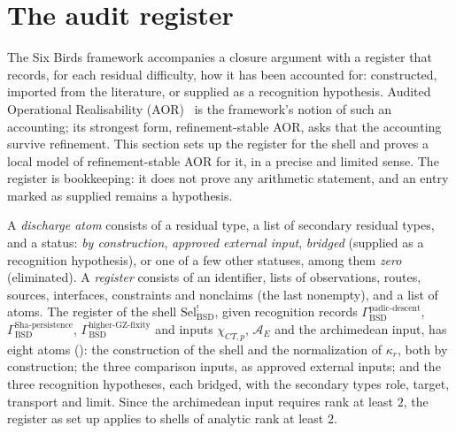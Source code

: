 \documentclass[11pt]{article}
\theoremstyle{definition}
\newcommand{\kapr}{\kappa_r}
\newcommand{\SelBSD}{\mathrm{Sel}^{!}_{\mathrm{BSD}}}   \newcommand{\rhoE}{\rho_E}                              \newcommand{\PiBSD}{\Pi_{\mathrm{BSD}}}                 \newcommand{\GammaPD}{\Gamma_{\mathrm{BSD}}^{\mathrm{padic\text{-}descent}}}
\newcommand{\GammaSP}{\Gamma_{\mathrm{BSD}}^{\mathrm{Sha\text{-}persistence}}}
\newcommand{\GammaGZ}{\Gamma_{\mathrm{BSD}}^{\mathrm{higher\text{-}GZ\text{-}fixity}}}
\newcommand{\chiCTp}{\chi_{CT,p}}                       \newcommand{\AofE}{\mathcal{A}_E}                        \newcommand{\etap}{\eta_p}                              \newcommand{\RefStable}{\mathbf{RefStable\,AOR}}
\begin{document}
 \section{The audit register}
\label{sec:aor-instance}

The Six Birds framework accompanies a closure argument with a register
that records, for each residual difficulty, how it has been accounted for:
constructed, imported from the literature, or supplied as a recognition
hypothesis.  Audited Operational Realisability (AOR)~\citep{TsiokosAOR2026} is the
framework's notion of such an accounting; its strongest form,
refinement-stable AOR, asks that the accounting survive refinement.  This
section sets up the register for the shell and proves a local model of
refinement-stable AOR for it, in a precise and limited sense.  The register is bookkeeping: it does not prove any
arithmetic statement, and an entry marked as supplied remains a
hypothesis.

\begin{definition}\label{def:closure:aor-sel-instance}
A \emph{discharge atom} consists of a residual type, a list of secondary
residual types, and a status: \emph{by construction}, \emph{approved
external input}, \emph{bridged} (supplied as a recognition hypothesis),
or one of a few other statuses, among them \emph{zero} (eliminated).  A
\emph{register} consists of an identifier, lists of observations, routes,
sources, interfaces, constraints and nonclaims (the last nonempty), and a
list of atoms.  The register of the shell $\SelBSD$, given recognition
records $\GammaPD$, $\GammaSP$, $\GammaGZ$ and inputs $\chiCTp$, $\AofE$
and the archimedean input, has eight atoms ():
the construction of the shell and the normalization of $\kapr$, both by
construction; the three comparison inputs, as approved external inputs;
and the three recognition hypotheses, each bridged, with the secondary
types role, target, transport and limit.  Since the archimedean input
requires rank at least $2$, the register as set up applies to shells of
analytic rank at least $2$.
\end{definition}
\end{document}
